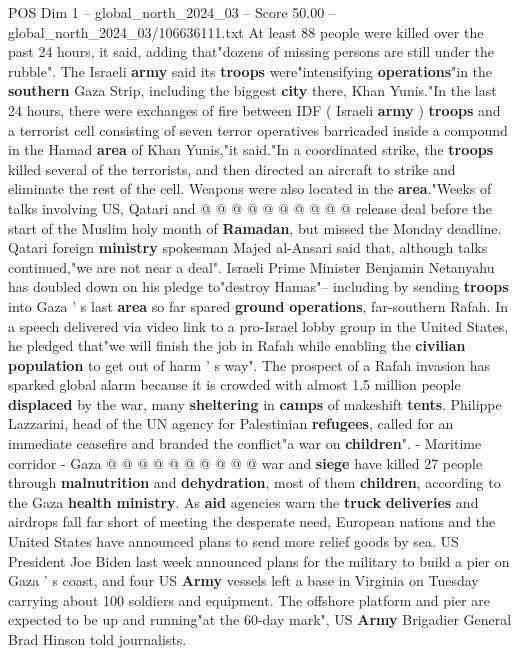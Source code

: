 \begin{textsample}{POS Dim 1 – global\_north\_2024\_03 – Score 50.00 – global\_north\_2024\_03/106636111.txt}
At least 88 people were killed over the past 24 hours, it said, adding that"dozens of missing persons are still under the rubble".
The Israeli \textbf{army} said its \textbf{troops} were"intensifying \textbf{operations}"in the \textbf{southern} Gaza Strip, including the biggest \textbf{city} there, Khan Yunis."In the last 24 hours, there were exchanges of fire between IDF ( Israeli \textbf{army} ) \textbf{troops} and a terrorist cell consisting of seven terror operatives barricaded inside a compound in the Hamad \textbf{area} of Khan Yunis,"it said."In a coordinated strike, the \textbf{troops} killed several of the terrorists, and then directed an aircraft to strike and eliminate the rest of the cell.
Weapons were also located in the \textbf{area}."Weeks of talks involving US, Qatari and @ @ @ @ @ @ @ @ @ @ release deal before the start of the Muslim holy month of \textbf{Ramadan}, but missed the Monday deadline.
Qatari foreign \textbf{ministry} spokesman Majed al-Ansari said that, although talks continued,"we are not near a deal".
Israeli Prime Minister Benjamin Netanyahu has doubled down on his pledge to"destroy Hamas"-- including by sending \textbf{troops} into Gaza ' s last \textbf{area} so far spared \textbf{ground} \textbf{operations}, far-southern Rafah.
In a speech delivered via video link to a pro-Israel lobby group in the United States, he pledged that"we will finish the job in Rafah while enabling the \textbf{civilian} \textbf{population} to get out of harm ' s way".
The prospect of a Rafah invasion has sparked global alarm because it is crowded with almost 1.5 million people \textbf{displaced} by the war, many \textbf{sheltering} in \textbf{camps} of makeshift \textbf{tents}.
Philippe Lazzarini, head of the UN agency for Palestinian \textbf{refugees}, called for an immediate ceasefire and branded the conflict"a war on \textbf{children}". - Maritime corridor - Gaza @ @ @ @ @ @ @ @ @ @ war and \textbf{siege} have killed 27 people through \textbf{malnutrition} and \textbf{dehydration}, most of them \textbf{children}, according to the Gaza \textbf{health} \textbf{ministry}.
As \textbf{aid} agencies warn the \textbf{truck} \textbf{deliveries} and airdrops fall far short of meeting the desperate need, European nations and the United States have announced plans to send more relief goods by sea.
US President Joe Biden last week announced plans for the military to build a pier on Gaza ' s coast, and four US \textbf{Army} vessels left a base in Virginia on Tuesday carrying about 100 soldiers and equipment.
The offshore platform and pier are expected to be up and running"at the 60-day mark", US \textbf{Army} Brigadier General Brad Hinson told journalists.

\end{textsample}
